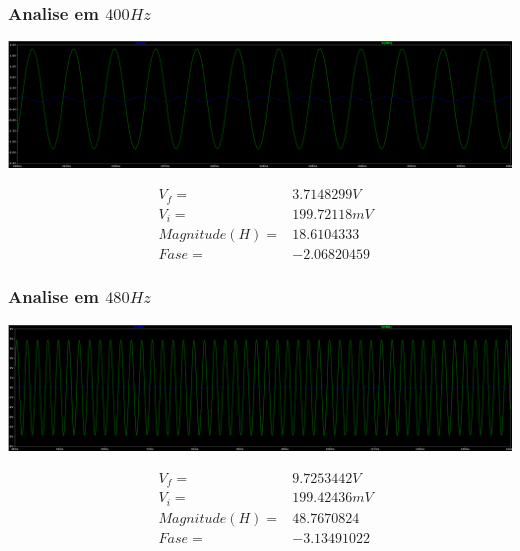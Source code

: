 \documentclass[12pt,twoside, a4paper, twocolumn]{article}
\begin{document}
\subsubsection{Analise em $400Hz$}


\begin{adjustbox}{scale=0.09}
    \includegraphics{ltfreq400.png}
\end{adjustbox}


\begin{equation*}
    \begin{aligned}
         & V_f =          & 3.7148299V  \\
         & V_i =          & 199.72118mV \\
         & Magnitude(H) = & 18.6104333  \\
         & Fase =         & -2.06820459
    \end{aligned}
\end{equation*}


\subsubsection{Analise em $480Hz$}


\begin{adjustbox}{scale=0.09}
    \includegraphics{ltfreq480.png}
\end{adjustbox}


\begin{equation*}
    \begin{aligned}
         & V_f =          & 9.7253442V  \\
         & V_i =          & 199.42436mV \\
         & Magnitude(H) = & 48.7670824  \\
         & Fase =         & -3.13491022
    \end{aligned}
\end{equation*}
\end{document}
